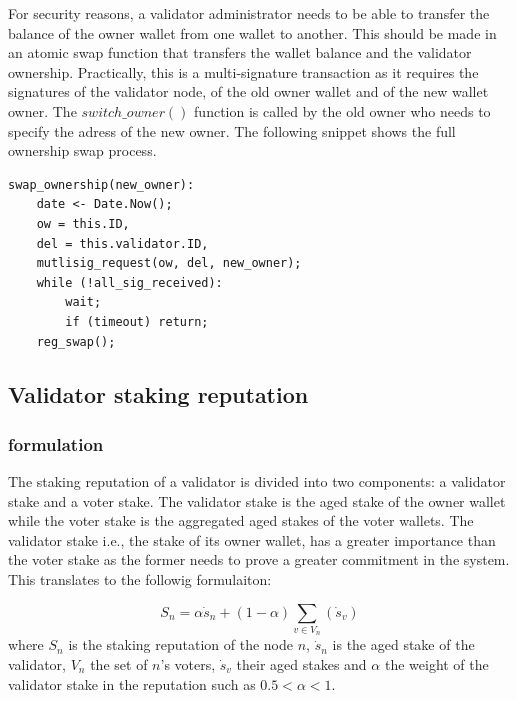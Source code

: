 \documentclass[]{article}
\begin{document}
For security reasons, a validator administrator needs to be able to transfer the balance of the owner wallet from one wallet to another. This should be made in an atomic swap function that transfers the wallet balance and the validator ownership. Practically, this is a multi-signature transaction as it requires the signatures of the validator node, of the old owner wallet and of the new wallet owner. The $switch\_owner()$ function is called by the old owner who needs to specify the adress of the new owner. The following snippet shows the full ownership swap process.

\begin{lstlisting}[frame=single]
swap_ownership(new_owner):
    date <- Date.Now();
    ow = this.ID,
    del = this.validator.ID,
    mutlisig_request(ow, del, new_owner);
    while (!all_sig_received):
        wait;
        if (timeout) return;
    reg_swap();
\end{lstlisting}

\subsection{Validator staking reputation}
\subsubsection{formulation}
The staking reputation of a validator is divided into two components: a validator stake and a voter stake. The validator stake is the aged stake of the owner wallet while the voter stake is the aggregated aged stakes of the voter wallets. The validator stake i.e., the stake of its owner wallet, has a greater importance than the voter stake as the former needs to prove a greater commitment in the system. This translates to the followig formulaiton: 

\begin{equation}
\label{eq:stakewalletTypeweight}
    S_n = \alpha\dot{s}_n + (1-\alpha) \sum_{v \in V_n} (\dot{s}_v) 
\end{equation}
where $S_n$ is the staking reputation of the node $n$, $\dot{s}_n$ is the aged stake of the validator, $V_n$ the set of $n$'s voters, $\dot{s}_v$ their aged stakes and $\alpha$ the weight of the validator stake in the reputation such as $0.5 < \alpha <1$. 
\end{document}
